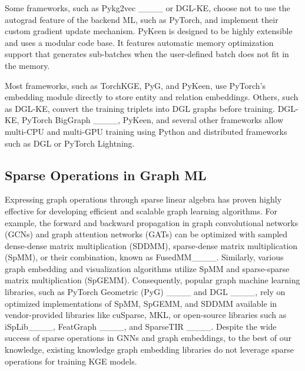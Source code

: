 Some frameworks, such as Pykg2vec ____ or DGL-KE, choose not to use the autograd feature of the backend ML, such as PyTorch, and implement their custom gradient update mechanism. PyKeen is designed to be highly extensible and uses a modular code base. It features automatic memory optimization support that generates sub-batches when the user-defined batch does not fit in the memory.

Most frameworks, such as TorchKGE, PyG, and PyKeen, use PyTorch's embedding module directly to store entity and relation embeddings.  Others, such as DGL-KE, convert the training triplets into DGL graphs before training. DGL-KE, PyTorch BigGraph ____, PyKeen, and several other frameworks allow multi-CPU and multi-GPU training using Python and distributed frameworks such as DGL or PyTorch Lightning.

\subsection{Sparse Operations in Graph ML} 
Expressing graph operations through sparse linear algebra has proven highly effective for developing efficient and scalable graph learning algorithms. 
For example, the forward and backward propagation in graph convolutional networks (GCNs) and graph attention networks (GATs) can be optimized with sampled dense-dense matrix multiplication (SDDMM), sparse-dense matrix multiplication (SpMM), or their combination, known as FusedMM____. 
Similarly, various graph embedding and visualization algorithms utilize SpMM and sparse-sparse matrix multiplication (SpGEMM). 
Consequently, popular graph machine learning libraries, such as PyTorch Geometric (PyG) ____ and DGL ____, rely on optimized implementations of SpMM, SpGEMM, and SDDMM available in vendor-provided libraries like cuSparse, MKL, or open-source libraries such as iSpLib____, FeatGraph ____, and SparseTIR ____.
Despite the wide success of sparse operations in GNNs and graph embeddings, to the best of our knowledge, existing knowledge graph embedding libraries do not leverage sparse operations for training KGE models.


